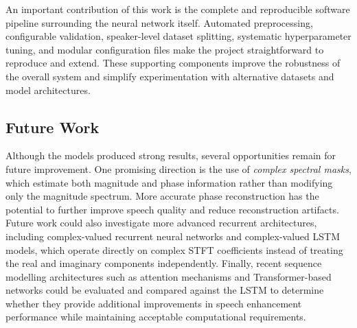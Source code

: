 \documentclass[11pt, letterpaper,titlepage]{article}
\begin{document}
An important contribution of this work is the complete and reproducible software pipeline surrounding the neural network itself. Automated preprocessing, configurable validation, speaker-level dataset splitting, systematic hyperparameter tuning, and modular configuration files make the project straightforward to reproduce and extend. These supporting components improve the robustness of the overall system and simplify experimentation with alternative datasets and model architectures.

\subsection{Future Work}

Although the models produced strong results, several opportunities remain for future improvement. One promising direction is the use of \emph{complex spectral masks}, which estimate both magnitude and phase information rather than modifying only the magnitude spectrum. More accurate phase reconstruction has the potential to further improve speech quality and reduce reconstruction artifacts. Future work could also investigate more advanced recurrent architectures, including complex-valued recurrent neural networks and complex-valued LSTM models, which operate directly on complex STFT coefficients instead of treating the real and imaginary components independently. Finally, recent sequence modelling architectures such as attention mechanisms and Transformer-based networks could be evaluated and compared against the LSTM to determine whether they provide additional improvements in speech enhancement performance while maintaining acceptable computational requirements.


	
\end{document}
